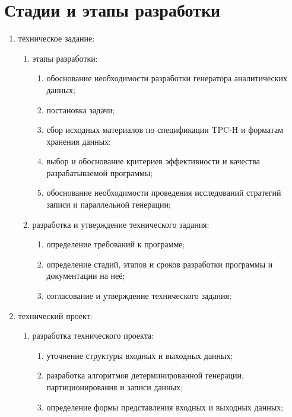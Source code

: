 \documentclass{../TechDoc}
\begin{document}
    \section{Стадии и этапы разработки}
    
    \begin{enumerate}
        \item техническое задание:
        \begin{enumerate}
            \item этапы разработки:
            \begin{enumerate}
                \item обоснование необходимости разработки генератора аналитических данных; 
                \item постановка задачи; 
                \item сбор исходных материалов по спецификации TPC-H и форматам хранения данных; 
                \item выбор и обоснование критериев эффективности и качества разрабатываемой программы; 
                \item обоснование необходимости проведения исследований стратегий записи и параллельной генерации; 
            \end{enumerate}
            \item разработка и утверждение технического задания:
            \begin{enumerate}
                \item определение требований к программе; 
                \item определение стадий, этапов и сроков разработки программы и документации на неё; 
                \item согласование и утверждение технического задания; 
            \end{enumerate}
        \end{enumerate}
    \item технический проект:
    \begin{enumerate}
        \item разработка технического проекта:
        \begin{enumerate}
            \item уточнение структуры входных и выходных данных; 
            \item разработка алгоритмов детерминированной генерации, партиционирования и записи данных; 
            \item определение формы представления входных и выходных данных; 

\end{enumerate}
\end{enumerate}
\end{enumerate}
\end{document}
